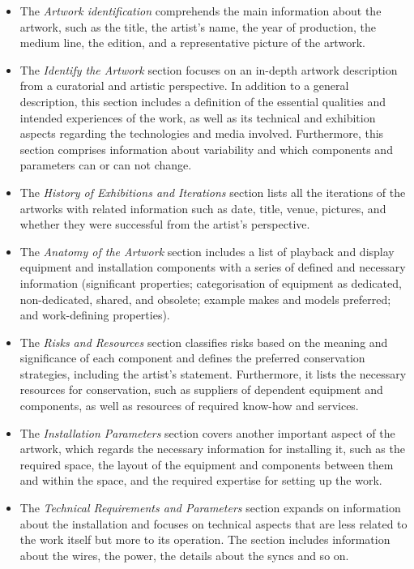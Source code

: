 \begin{itemize}
    \item The \textit{Artwork identification} comprehends the main information about the artwork, such as the title, the artist's name, the year of production, the medium line, the edition, and a representative picture of the artwork.
    \item The \textit{Identify the Artwork} section focuses on an in-depth artwork description from a curatorial and artistic perspective. In addition to a general description, this section includes a definition of the essential qualities and intended experiences of the work, as well as its technical and exhibition aspects regarding the technologies and media involved. Furthermore, this section comprises information about variability and which components and parameters can or can not change.
    \item The \textit{History of Exhibitions and Iterations} section lists all the iterations of the artworks with related information such as date, title, venue, pictures, and whether they were successful from the artist’s perspective.
    \item The \textit{Anatomy of the Artwork} section includes a list of playback and display equipment and installation components with a series of defined and necessary information (significant properties; categorisation of equipment as dedicated, non-dedicated, shared, and obsolete; example makes and models preferred; and work-defining	properties).
    \item The \textit{Risks and Resources} section classifies risks based on the meaning and significance of each component and defines the preferred conservation strategies, including the artist’s statement. Furthermore, it lists the necessary resources for conservation, such as suppliers of dependent equipment and components, as well as resources of required know-how and services.
    \item The \textit{Installation Parameters} section covers another important aspect of the artwork, which regards the necessary information for installing it, such as the required space, the layout of the equipment and components between them and within the space, and the required expertise for setting up the work.
    \item The \textit{Technical Requirements and Parameters} section expands on information about the installation and focuses on technical aspects that are less related to the work itself but more to its operation. The section includes information about the wires, the power, the details about the syncs and so on.
\end{itemize}


